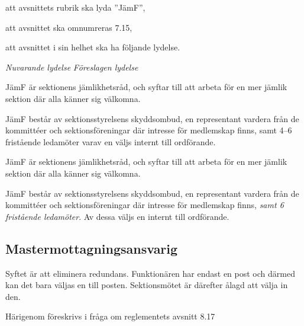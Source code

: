 \documentclass{article}
\newenvironment{lydelse}
    {\begin{paracol}{2}%
        \emph{Nuvarande lydelse}%
        \switchcolumn%
        \emph{Föreslagen lydelse}%
    \end{paracol}%
    \begin{enumerate}[label=\thesubsection.\arabic*]%
    \begin{paracol}{2}%
    }{\end{paracol}\end{enumerate}}
\begin{document}
\begin{dels}
    \item att avsnittets rubrik ska lyda ''JämF'',
    \item att avsnittet ska omnumreras 7.15,
    \item att avsnittet i sin helhet ska ha följande lydelse.
\end{dels}
\begin{lydelse}
    \setcounter{section}{8}
    \setcounter{subsection}{16}
    
    \item JämF är sektionens jämlikhetsråd, och syftar till att arbeta för en mer jämlik sektion där alla känner sig välkomna.
	    
    \item JämF består av sektionsstyrelsens skyddsombud, en representant vardera från de kommittéer och sektionsföreningar där intresse för medlemskap finns, samt 4--6 fristående ledamöter varav en väljs internt till ordförande. %
    
    \setcounter{section}{7}
    \setcounter{subsection}{15}
    \switchcolumn
    
    \item JämF är sektionens jämlikhetsråd, och syftar till att arbeta för en mer jämlik sektion där alla känner sig välkomna.
	    
    \item JämF består av sektionsstyrelsens skyddsombud, en representant vardera från de kommittéer och sektionsföreningar där intresse för medlemskap finns, \emph{samt 6 fristående ledamöter}.
    Av dessa väljs en internt till ordförande.
    
\end{lydelse}

\subsection{Mastermottagningsansvarig}
Syftet är att eliminera redundans.
Funktionären har endast en post och därmed kan det bara väljas en till posten.
Sektionsmötet är därefter ålagd att välja in den.

Härigenom föreskrivs i fråga om reglementets avsnitt 8.17
\end{document}
